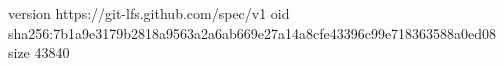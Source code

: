 version https://git-lfs.github.com/spec/v1
oid sha256:7b1a9e3179b2818a9563a2a6ab669e27a14a8cfe43396c99e718363588a0ed08
size 43840
